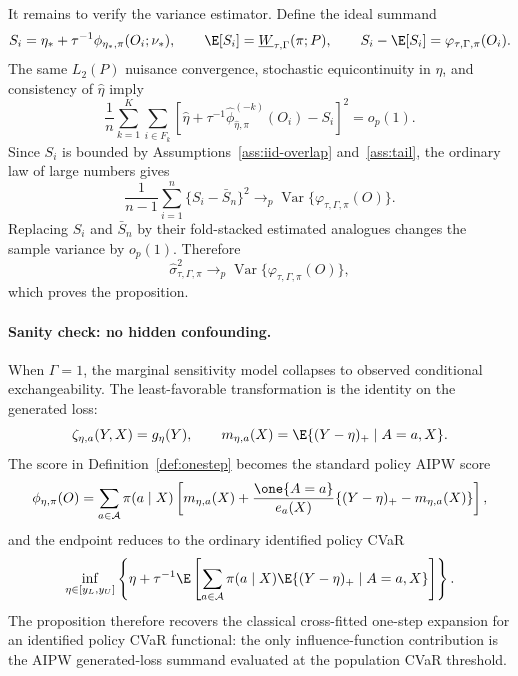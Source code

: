 It remains to verify the variance estimator.  Define the ideal summand
\[
S_i=\eta_*+\tau^{-1}\phi_{\eta_*,\pi}(O_i;\nu_*),
\qquad
\E[S_i]=\underline W_{\tau,\Gamma}(\pi;P),
\qquad
S_i-\E[S_i]=\varphi_{\tau,\Gamma,\pi}(O_i).
\]
The same \(L_2(P)\) nuisance convergence, stochastic equicontinuity in \(\eta\), and consistency of
\(\widehat\eta\) imply
\[
\frac1n\sum_{k=1}^K\sum_{i\in F_k}
\left[
\widehat\eta+\tau^{-1}\widehat\phi_{\widehat\eta,\pi}^{(-k)}(O_i)-S_i
\right]^2
=o_p(1).
\]
Since \(S_i\) is bounded by Assumptions~\ref{ass:iid-overlap} and~\ref{ass:tail}, the ordinary law of large numbers gives
\[
\frac1{n-1}\sum_{i=1}^n
\{S_i-\bar S_n\}^2
\to_p
\operatorname{Var}\{\varphi_{\tau,\Gamma,\pi}(O)\}.
\]
Replacing \(S_i\) and \(\bar S_n\) by their fold-stacked estimated analogues changes the sample variance by \(o_p(1)\).  Therefore
\[
\widehat\sigma_{\tau,\Gamma,\pi}^2
\to_p
\operatorname{Var}\{\varphi_{\tau,\Gamma,\pi}(O)\},
\]
which proves the proposition.

\paragraph{Sanity check: no hidden confounding.}
When \(\Gamma=1\), the marginal sensitivity model collapses to observed conditional exchangeability.  The least-favorable transformation is the identity on the generated loss:
\[
\zeta_{\eta,a}(Y,X)=g_\eta(Y),
\qquad
m_{\eta,a}(X)=\E\{(Y-\eta)_+\mid A=a,X\}.
\]
The score in Definition~\ref{def:onestep} becomes the standard policy AIPW score
\[
\phi_{\eta,\pi}(O)
=
\sum_{a\in\mathcal A}\pi(a\mid X)
\left[
m_{\eta,a}(X)
+\frac{\one\{A=a\}}{e_a(X)}
\{(Y-\eta)_+-m_{\eta,a}(X)\}
\right],
\]
and the endpoint reduces to the ordinary identified policy CVaR
\[
\inf_{\eta\in[y_L,y_U]}
\left\{
\eta+\tau^{-1}\E\left[
\sum_{a\in\mathcal A}\pi(a\mid X)
\E\{(Y-\eta)_+\mid A=a,X\}
\right]\right\}.
\]
The proposition therefore recovers the classical cross-fitted one-step expansion for an identified policy CVaR functional: the only influence-function contribution is the AIPW generated-loss summand evaluated at the population CVaR threshold.

